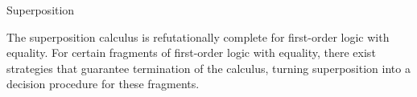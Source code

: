 \begin{entry}{Superposition}
\begin{technicalities}
The superposition calculus is refutationally complete for
first-order logic with equality.
For certain fragments of first-order logic with equality,
there exist strategies that guarantee termination of the calculus,
turning superposition into a decision procedure for these fragments.
\end{technicalities}













\end{entry}
